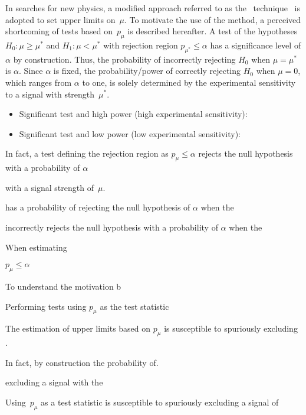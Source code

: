 In searches for new physics, a modified approach referred to as the
\CLs~technique~\cite{Junk:1999kv,Read:2000ru,Read:2002hq} is adopted to set
upper limits on~$\mu$. To motivate the use of the \CLs method, a perceived
shortcoming of tests based on~$p_\mu$ is described hereafter. A test of the
hypotheses $H_0: \mu \geq \mu^*$ and $H_1: \mu < \mu^*$ with rejection region
$p_{\mu^*} \leq \alpha$ has a significance level of $\alpha$ by
construction. Thus, the probability of incorrectly rejecting $H_0$ when
$\mu = \mu^*$ is $\alpha$. Since $\alpha$ is fixed, the probability/power of
correctly rejecting $H_0$ when $\mu = 0$, which ranges from $\alpha$ to one, is
solely determined by the experimental sensitivity to a signal with
strength~$\mu^{*}$.
\begin{itemize}

\item Significant test and high power (high experimental sensitivity):

\item Significant test and low power (low experimental sensitivity):

\end{itemize}










In fact, a test defining the rejection region as $p_\mu \leq \alpha$ rejects the
null hypothesis with a probability of $\alpha$


with a signal strength
of~$\mu$.


has a
probability of rejecting the null hypothesis of $\alpha$ when the

incorrectly
rejects the null hypothesis with a probability of $\alpha$ when the



When estimating



$p_\mu \leq \alpha$

To understand the motivation b

Performing tests using $p_\mu$ as the test statistic


The estimation of upper limits based on $p_\mu$ is susceptible to spuriously
excluding .


In fact, by construction the probability of.




excluding a signal with the


Using~$p_\mu$ as a test statistic is susceptible to
spuriously excluding a signal of




